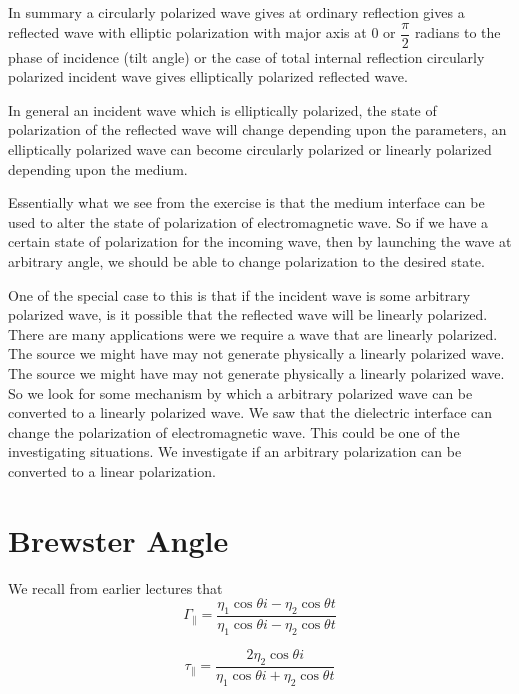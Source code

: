 In summary a circularly polarized wave gives at ordinary reflection gives a reflected wave with elliptic polarization with major axis at 0 or $\dfrac{\pi}{2}$ radians to the phase of incidence (tilt angle) or the case of total internal reflection circularly polarized incident wave gives elliptically polarized reflected wave.

In general an incident wave which is elliptically polarized, the state of polarization of the reflected wave will change depending upon the parameters, an elliptically polarized wave can become circularly polarized or linearly polarized depending upon the medium.

Essentially what we see from the exercise is that the medium interface can be used to alter the state of polarization of electromagnetic wave. So if we have a certain state of polarization for the incoming wave, then by launching the wave at arbitrary angle, we should be able to change polarization to the desired state.

One of the special case to this is that if the incident wave is some arbitrary polarized wave, is it possible that the reflected wave will be linearly polarized. There are many applications were we require a wave that are linearly polarized. The source we might have may not generate physically a linearly polarized wave. The source we might have may not generate physically a linearly polarized wave. So we look for some mechanism by which a arbitrary polarized wave can be converted to a linearly polarized wave. We saw that the dielectric interface can change the polarization of electromagnetic wave. This could be one of the investigating situations. We investigate if an arbitrary polarization can be converted to a linear polarization.

\section{Brewster Angle}
We recall from earlier lectures that 
\begin{equation}
\Gamma_\parallel = \dfrac{\eta_1\cos\textit{$\theta$i} - \eta_2\cos\textit{$\theta$t}}  {\eta_1\cos\textit{$\theta$i} - \eta_2\cos\textit{$\theta$t}}
\end{equation}

\begin{equation}
\tau_\parallel = \dfrac{2\eta_2\cos\textit{$\theta$i}} {\eta_1\cos\textit{$\theta$i} + \eta_2\cos\textit{$\theta$t}}
\end{equation}

